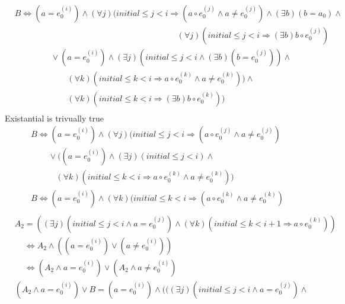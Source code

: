 \documentclass[a4paper,10pt]{article}
\newcommand{\idx}{\ensuremath{i}\xspace}
\newcommand{\idxinitial}{\ensuremath{\mathit{initial}}\xspace}
\newcommand{\at}[1]{{(#1)}}
\newcommand{\impl}{\ensuremath{\Longrightarrow}}
\newcommand{\Inv}[1]{\ensuremath{\mathit{Inv}(#1)\xspace}}
\newenvironment{proof}[1][Proof.]{\begin{trivlist}
\item[\hskip \labelsep {\bfseries #1}]}{\end{trivlist}}
\begin{document}
\begin{proof}
  \begin{align*}
    &B\Leftrightarrow (a = e_0^\at{\idx})\land (\forall j)(\idxinitial \leq j < \idx \impl (a \circ e_0^\at{j}\land a \neq e_0^\at{j}) 
       \land (\exists b) (b = a_0) \land \\
    &\phantom{(a = e_0^\at{\idx}) \land (\exists b) ((b \bullet e_0^\at{\idx}) \land \Inv{\idx}} 
       (\forall j)(\idxinitial \leq j < \idx \impl (\exists b) b \circ e_0^\at{j})\\
    &\phantom{B= (a =} 
       \lor (a = e_0^\at{\idx}) \land (\exists j)(\idxinitial \leq j < \idx \land (\exists b) (b = e_0^\at{j})) \land \\
    &\phantom{B= (a = e_0^\at{\idx}} 
       (\forall k)(\idxinitial \leq k < \idx \impl a \circ e_0^\at{k} \land a \neq e_0^\at{k})) \land \\
    &\phantom{B= (a = e_0^\at{\idx}} 
       (\forall k)(\idxinitial \leq k < \idx \impl (\exists b) b \circ e_0^\at{k})) \\
  \end{align*}
  Existantial is trivually true
  \begin{align*}
    &B\Leftrightarrow (a = e_0^\at{\idx})  \land (\forall j)(\idxinitial \leq j < \idx \impl (a \circ e_0^\at{j} \land a \neq e_0^\at{j}) \\
    &\phantom{B=} 
       \lor ((a = e_0^\at{\idx}) \land (\exists j)(\idxinitial \leq j < \idx ) \land \\
    &\phantom{B=(a} 
       (\forall k)(\idxinitial \leq k < \idx \impl a \circ e_0^\at{k} \land a \neq e_0^\at{k})) \\
    &B\Leftrightarrow (a = e_0^\at{\idx})  \land (\forall k)(\idxinitial \leq k < \idx \impl (a \circ e_0^\at{k} \land a \neq e_0^\at{k}) \\
  \end{align*}
  \begin{align*}
    &A_2= ((\exists j)(\idxinitial \leq j < \idx \land a = e_0^\at{j}) \land (\forall k)(\idxinitial \leq k < \idx+1 \impl a \circ e_0^\at{k})) \\ 
    &\phantom{A_2}\Leftrightarrow A_2 \land ((a = e_0^\at{\idx}) \lor (a \neq e_0^\at{\idx})) \\
    &\phantom{A_2}\Leftrightarrow  (A_2 \land a = e_0^\at{\idx}) \lor (A_2 \land a \neq e_0^\at{\idx})
  \end{align*}
  \begin{align*}
   &(A_2 \land a = e_0^\at{\idx}) \lor B = (a = e_0^\at{\idx}) \land (((\exists j)(\idxinitial \leq j < \idx \land a = e_0^\at{j}) \land \\

\end{align*}
\end{proof}
\end{document}
